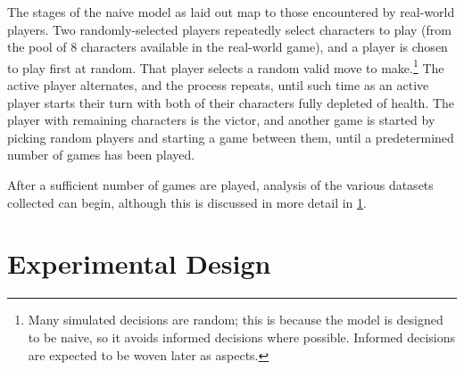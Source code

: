 The stages of the naive model as laid out map to those encountered by real-world
players. Two randomly-selected players repeatedly select characters to play
(from the pool of 8 characters available in the real-world game), and a player
is chosen to play first at random. That player selects a random valid move to
make.\footnote{Many simulated decisions are random; this is because the model is
designed to be naive, so it avoids informed decisions where possible. Informed
decisions are expected to be woven later as aspects.} The active player alternates, and the process repeats, until
such time as an active player starts their turn with both of their characters
fully depleted of health. The player with remaining characters is the victor,
and another game is started by picking random players and starting a game
between them, until a predetermined number of games has been played.

After a sufficient number of games are played, analysis of the various datasets
collected can begin, although this is discussed in more detail in
\cref{sec:optimisation_with_aspects_experimental_design}.




\section{Experimental Design}\label{sec:optimisation_with_aspects_experimental_design}




